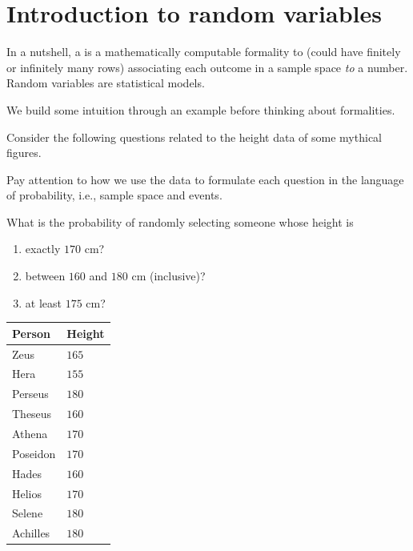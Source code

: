 \documentclass[../main.tex]{subfiles}
\begin{document}
 \section{Introduction to random variables}

In a nutshell, a  is a mathematically computable formality to  (could have finitely or infinitely many rows) associating each outcome in a sample space \emph{to} a number.  Random variables are statistical models.

We build some intuition through an example before thinking about formalities. 

\begin{example} \label{ex:random-variable-intro}
  Consider the following questions related to the height data of some mythical figures.

  Pay attention to how we use the data to formulate each question in the language of probability, i.e., sample space and events.

  {\color{main}
    What is the probability of randomly selecting someone whose height is 
    \begin{enumerate}
      \item exactly \(170\) cm?
      \item between \(160\) and \(180\) cm (inclusive)?
      \item at least \(175\) cm?
    \end{enumerate}
  }

  \hfill{}
  \begin{tabular}{l|l}
    Person & Height \\\midrule
    Zeus & \(165\) \\
    Hera & \(155\) \\
    Perseus & \(180\) \\
    Theseus & \(160\) \\
    Athena & \(170\) \\
    Poseidon  & \(170\) \\
    Hades & \(160\) \\
    Helios & \(170\) \\
    Selene & \(180\) \\
    Achilles & \(180\)
  \end{tabular}

  \blanks*
\end{example}
\clearpage
\end{document}
